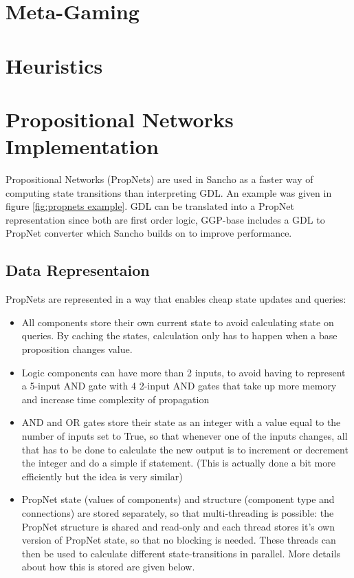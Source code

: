 \section{Meta-Gaming}

\section{Heuristics}

\section{Propositional Networks Implementation}

Propositional Networks (PropNets) are used in Sancho as a faster way of computing state transitions than interpreting GDL. An example was given in  figure \ref{fig:propnets example}.
GDL can be translated into a PropNet representation since both are first order logic, GGP-base includes a GDL to PropNet converter which Sancho builds on to improve performance.

\subsection{Data Representaion}
\noindent PropNets are represented in a way that enables cheap state updates and queries:
\begin{itemize}
	\item All components store their own current state to avoid calculating state on queries. By caching the states, calculation only has to happen when a base proposition changes value.
	
	\item Logic components can have more than 2 inputs, to avoid having to represent a 5-input AND gate with 4 2-input AND gates that take up more memory and increase time complexity of propagation
	
	\item AND and OR gates store their state as an integer with a value equal to the number of inputs set to True, so that whenever one of the inputs changes, all that has to be done to calculate the new output is to increment or decrement the integer and do a simple if statement. (This is actually done a bit more efficiently but the idea is very similar)
	
	\item PropNet state (values of components) and structure (component type and connections) are stored separately, so that multi-threading is possible: the PropNet structure is shared and read-only and each thread stores it's own version of PropNet state, so that no blocking is needed. These threads can then be used to calculate different state-transitions in parallel. More details about how this is stored are given below.
\end{itemize}

